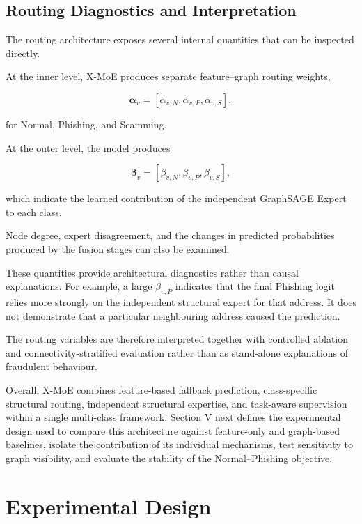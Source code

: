 \documentclass{ieeeaccess}
\begin{document}
\subsection{Routing Diagnostics and Interpretation}

The routing architecture exposes several internal quantities that can be inspected directly.

At the inner level, X-MoE produces separate feature--graph routing weights,

\begin{equation}
\boldsymbol{\alpha}_v
=
[
\alpha_{v,N},
\alpha_{v,P},
\alpha_{v,S}
],
\end{equation}

for Normal, Phishing, and Scamming.

At the outer level, the model produces

\begin{equation}
\boldsymbol{\beta}_v
=
[
\beta_{v,N},
\beta_{v,P},
\beta_{v,S}
],
\end{equation}

which indicate the learned contribution of the independent GraphSAGE Expert to each class.

Node degree, expert disagreement, and the changes in predicted probabilities produced by the fusion stages can also be examined.

These quantities provide architectural diagnostics rather than causal explanations. For example, a large \(\beta_{v,P}\) indicates that the final Phishing logit relies more strongly on the independent structural expert for that address. It does not demonstrate that a particular neighbouring address caused the prediction.

The routing variables are therefore interpreted together with controlled ablation and connectivity-stratified evaluation rather than as stand-alone explanations of fraudulent behaviour.

Overall, X-MoE combines feature-based fallback prediction, class-specific structural routing, independent structural expertise, and task-aware supervision within a single multi-class framework. Section V next defines the experimental design used to compare this architecture against feature-only and graph-based baselines, isolate the contribution of its individual mechanisms, test sensitivity to graph visibility, and evaluate the stability of the Normal--Phishing objective.



\section{Experimental Design}
\end{document}
